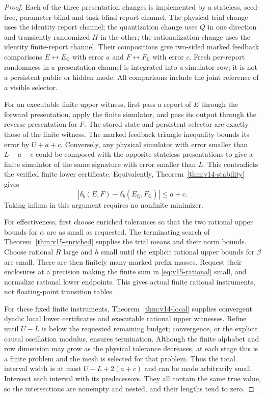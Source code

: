 \begin{proof}
Each of the three presentation changes is implemented by a stateless,
seed-free, parameter-blind and task-blind report channel. The physical
trial change uses the identity report channel; the quantization change
uses $Q$ in one direction and transiently randomized $H$ in the other;
the rationalization change uses the identity finite-report channel.
Their compositions give two-sided marked feedback comparisons
$E\leftrightarrow E_{\mathbb Q}$ with error $a$ and
$F\leftrightarrow F_{\mathbb Q}$ with error $c$. Fresh per-report
randomness in a presentation channel is integrated into a simulator row;
it is not a persistent public or hidden mode. All comparisons include
the joint reference of a visible selector.

For an executable finite upper witness, first pass a report of $E$
through the forward presentation, apply the finite simulator, and pass
its output through the reverse presentation for $F$. The stored state
and persistent selector are exactly those of the finite witness. The
marked feedback triangle inequality bounds its error by $U+a+c$.
Conversely, any physical simulator with error smaller than $L-a-c$
could be composed with the opposite stateless presentations to give a
finite simulator of the same signature with error smaller than $L$.
This contradicts the verified finite lower certificate. Equivalently,
Theorem~\ref{thm:v14-stability} gives
\[
 |\delta_b(E,F)-\delta_b(E_{\mathbb Q},F_{\mathbb Q})|\le a+c.
\]
Taking infima in this argument requires no nonfinite minimizer.

For effectiveness, first choose enriched tolerances so that the two
rational upper bounds for $\alpha$ are as small as requested. The
terminating search of Theorem~\ref{thm:v15-enriched} supplies the trial
means and their norm bounds. Choose rational $R$ large and $h$ small
until the explicit rational upper bounds for $\beta$ are small. There
are then finitely many marked prefix masses. Request their enclosures
at a precision making the finite sum in \eqref{eq:v15-rational} small,
and normalize rational lower endpoints. This gives actual finite
rational instruments, not floating-point transition tables.

For these fixed finite instruments, Theorem~\ref{thm:v14-local} supplies
convergent dyadic local lower certificates and executable rational
upper witnesses. Refine until $U-L$ is below the requested remaining
budget; convergence, or the explicit causal oscillation modulus, ensures
termination. Although the finite alphabet and row dimension may grow
as the physical tolerance decreases, at each stage this is a finite
problem and the mesh is selected for that problem. Thus the total
interval width is at most $U-L+2(a+c)$ and can be made arbitrarily
small. Intersect each interval with its predecessors. They all contain
the same true value, so the intersections are nonempty and nested,
and their lengths tend to zero.
\end{proof}

